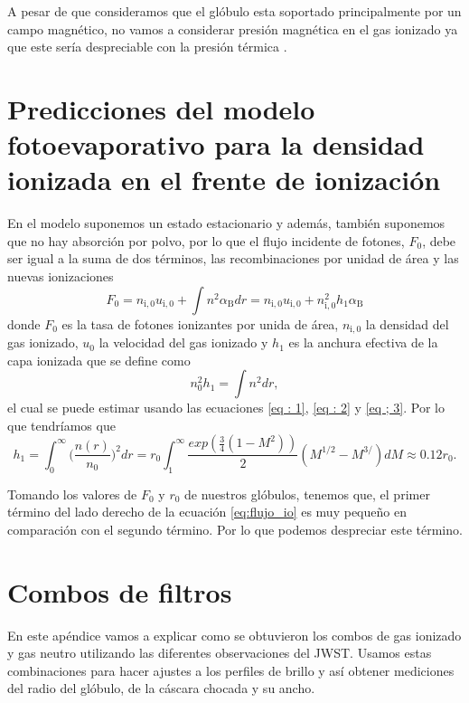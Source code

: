 \documentclass{book}
\begin{document}
A pesar de que consideramos que el glóbulo esta soportado principalmente por un campo magnético, no vamos a considerar presión magnética en el gas ionizado ya que este sería despreciable con la presión térmica \citep{Will:2009}.

\chapter{Predicciones del modelo fotoevaporativo para la densidad ionizada en el frente de ionización }\label{App : tasa de fotoionizacion}

En el modelo suponemos un estado estacionario y además, también suponemos que no hay absorción por polvo, por lo que el flujo incidente de fotones, $F_0$, debe ser igual a la suma de dos términos, las recombinaciones por unidad de área y las nuevas ionizaciones
\begin{equation}\label{eq:flujo_io}
F_0 = n_\mathrm{i,0} u_\mathrm{i,0} +\int n^2\alpha_\mathrm{B}dr = n_\mathrm{i,0}u_\mathrm{i,0}+n_\mathrm{i,0}^2h_1\alpha_\mathrm{B}
\end{equation}
donde $F_0$ es la tasa de fotones ionizantes por unida de área, $n_\mathrm{i,0}$ la densidad del gas ionizado, $u_0$ la velocidad del gas ionizado y $h_1$ es la anchura efectiva de la capa ionizada que se define como
\begin{equation}
n_0^2h_1=\int n^2dr,
\end{equation}
el cual se puede estimar usando las ecuaciones  \ref{eq : 1}, \ref{eq : 2} y \ref{eq ; 3}. Por lo que tendríamos que 
\begin{equation}
h_1=\int_0^\infty \Big(\frac{n(r)}{n_0}\Big)^2dr=r_0\int_1^\infty\frac{exp(\frac{3}{4}(1-M^2))}{2}(M^{1/2}-M^{3/})dM\approx0.12r_0.\end{equation}

Tomando los valores de $F_0$ y $r_0$ de nuestros glóbulos, tenemos que, el primer término del lado derecho de la ecuación \ref{eq:flujo_io} es muy pequeño en comparación con el segundo término. Por lo que podemos despreciar este término.

\chapter{Combos de filtros}\label{AP: combos}

En este apéndice vamos a explicar como se obtuvieron los combos de gas ionizado y gas neutro utilizando las diferentes observaciones del JWST. Usamos estas combinaciones para hacer ajustes a los perfiles de brillo y así obtener mediciones del radio del glóbulo, de la cáscara chocada y su ancho.
\end{document}
